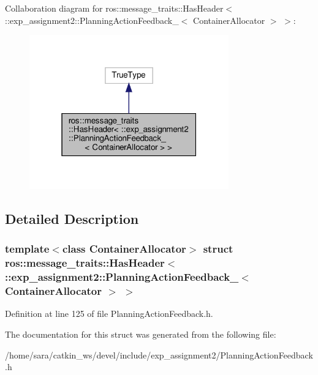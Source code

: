 Collaboration diagram for ros\+:\+:message\+\_\+traits\+:\+:Has\+Header$<$ \+:\+:exp\+\_\+assignment2\+:\+:Planning\+Action\+Feedback\+\_\+$<$ Container\+Allocator $>$ $>$\+:
\nopagebreak
\begin{figure}[H]
\begin{center}
\leavevmode
\includegraphics[width=244pt]{structros_1_1message__traits_1_1HasHeader_3_01_1_1exp__assignment2_1_1PlanningActionFeedback___38785fe0ea51dbb52bdf215069fb7e58e}
\end{center}
\end{figure}


\subsection{Detailed Description}
\subsubsection*{template$<$class Container\+Allocator$>$\newline
struct ros\+::message\+\_\+traits\+::\+Has\+Header$<$ \+::exp\+\_\+assignment2\+::\+Planning\+Action\+Feedback\+\_\+$<$ Container\+Allocator $>$ $>$}



Definition at line 125 of file Planning\+Action\+Feedback.\+h.



The documentation for this struct was generated from the following file\+:\begin{DoxyCompactItemize}
\item 
/home/sara/catkin\+\_\+ws/devel/include/exp\+\_\+assignment2/Planning\+Action\+Feedback.\+h\end{DoxyCompactItemize}
